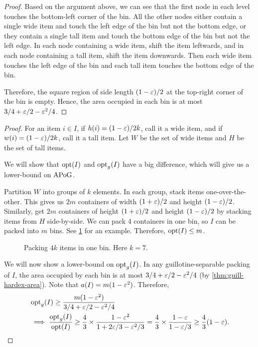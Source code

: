 \begin{proof}
Based on the argument above, we can see that the first node in each level
touches the bottom-left corner of the bin. All the other nodes either
contain a single wide item and touch the left edge of the bin but not the bottom edge,
or they contain a single tall item and touch the bottom edge of the bin but not the left edge.
In each node containing a wide item, shift the item leftwards,
and in each node containing a tall item, shift the item downwards.
Then each wide item touches the left edge of the bin
and each tall item touches the bottom edge of the bin.

Therefore, the square region of side length $(1-\varepsilon)/2$
at the top-right corner of the bin is empty.
Hence, the area occupied in each bin is at most $3/4 + \varepsilon/2 - \varepsilon^2/4$.
\end{proof}

\rdefHardItems*

\rthmAPoGLB*
\begin{proof}
For an item $i \in I$, if $h(i) = (1-\varepsilon)/2k$, call it a wide item,
and if $w(i) = (1-\varepsilon)/2k$, call it a tall item.
Let $W$ be the set of wide items and $H$ be the set of tall items.

We will show that $\operatorname{opt}(I)$ and $\operatorname{opt}_g(I)$ have a big difference,
which will give us a lower-bound on $\mathrm{APoG}$.

Partition $W$ into groups of $k$ elements.
In each group, stack items one-over-the-other.
This gives us $2m$ containers of width $(1+\varepsilon)/2$ and height $(1-\varepsilon)/2$.
Similarly, get $2m$ containers of height $(1+\varepsilon)/2$ and height $(1-\varepsilon)/2$
by stacking items from $H$ side-by-side.
We can pack 4 containers in one bin, so $I$ can be packed into $m$ bins.
See \cref{fig:thin-gadget} for an example.
Therefore, $\operatorname{opt}(I) \le m$.

\begin{figure}[htb]
\centering

\caption{Packing $4k$ items in one bin. Here $k = 7$.}
\label{fig:thin-gadget}
\end{figure}

We will now show a lower-bound on $\operatorname{opt}_g(I)$.
In any guillotine-separable packing of $I$,
the area occupied by each bin is at most $3/4 + \varepsilon/2 - \varepsilon^2/4$
(by \cref{thm:guill-hardex-area}).
Note that $a(I) = m(1 - \varepsilon^2)$. Therefore,
\begin{align*}
& \operatorname{opt}_g(I) \ge \frac{m(1-\varepsilon^2)}{3/4 + \varepsilon/2 - \varepsilon^2/4}
\\ &\implies \frac{\operatorname{opt}_g(I)}{\operatorname{opt}(I)}
    \ge \frac{4}{3} \times \frac{1-\varepsilon^2}{1 + 2\varepsilon/3 - \varepsilon^2/3}
    = \frac{4}{3} \times \frac{1-\varepsilon}{1 - \varepsilon/3}
    \ge \frac{4}{3}(1-\varepsilon).
\qedhere
\end{align*}
\end{proof}

